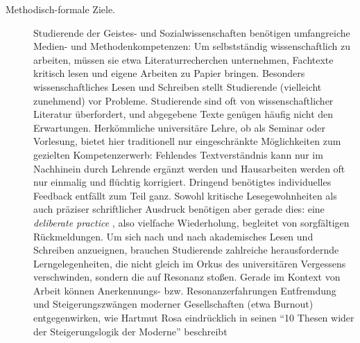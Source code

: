 \documentclass[11pt,a4paper,oneside]{article}
\begin{document}
\begin{description}
	\item[Methodisch-formale Ziele.]
		Studierende der Geistes- und Sozialwissenschaften benötigen umfangreiche Medien- und Methodenkompetenzen: Um selbstständig wissenschaftlich zu arbeiten, müssen sie etwa Literaturrecherchen unternehmen, Fachtexte kritisch lesen und eigene Arbeiten zu Papier bringen.
		Besonders wissenschaftliches Lesen und Schreiben stellt Studierende (vielleicht zunehmend) vor Probleme.
		Studierende sind oft von wissenschaftlicher Literatur überfordert, und abgegebene Texte genügen häufig nicht den Erwartungen.
		Herkömmliche universitäre Lehre, ob als Seminar oder Vorlesung, bietet hier traditionell nur eingeschränkte Möglichkeiten zum gezielten Kompetenzerwerb: Fehlendes Textverständnis kann nur im Nachhinein durch Lehrende ergänzt werden und Hausarbeiten werden oft nur einmalig und flüchtig korrigiert.
		Dringend benötigtes individuelles Feedback entfällt zum Teil ganz.
		Sowohl kritische Lesegewohnheiten als auch präziser schriftlicher Ausdruck benötigen aber gerade dies: eine \emph{deliberate practice} \cite{Ericsson2007}, also vielfache Wiederholung, begleitet von sorgfältigen Rückmeldungen.
		Um sich nach und nach akademisches Lesen und Schreiben anzueignen, brauchen Studierende zahlreiche herausfordernde Lerngelegenheiten, die nicht gleich im Orkus des universitären Vergessens verschwinden, sondern die auf Resonanz stoßen.
		Gerade im Kontext von Arbeit können Anerkennungs- bzw. Resonanzerfahrungen Entfremdung und Steigerungszwängen moderner Gesellschaften (etwa Burnout) entgegenwirken, wie Hartmut Rosa eindrücklich in seinen ``10 Thesen wider der Steigerungslogik der Moderne'' beschreibt \cite{Rosa-Paech-etal-2014}


\end{description}
\end{document}
